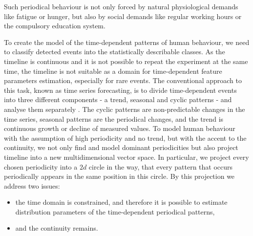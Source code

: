 Such periodical behaviour is not only forced by natural physiological demands like fatigue or hunger, but also by social demands like regular working hours or the compulsory education system. 

To create the model of the time-dependent patterns of human behaviour, we need to classify detected events into the statistically describable classes.
As the timeline is continuous and it is not possible to repeat the experiment at the same time, the timeline is not suitable as a domain for time-dependent feature parameters estimation, especially for rare events.
The conventional approach to this task, known as time series forecasting, is to divide time-dependent events into three different components - a trend, seasonal and cyclic patterns - and analyse them separately \cite{gould2008forecasting}.
The cyclic patterns are non-predictable changes in the time series, seasonal patterns are the periodical changes, and the trend is continuous growth or decline of measured values.
To model human behaviour with the assumption of high periodicity and no trend, but with the accent to the continuity, we not only find and model dominant periodicities but also project timeline into a new multidimensional vector space.
In particular, we project every chosen periodicity into a $2d$ circle in the way, that every pattern that occurs periodically appears in the same position in this circle.
By this projection we address two issues:
\begin{itemize}
    \item the time domain is constrained, and therefore it is possible to estimate distribution parameters of the time-dependent periodical patterns,
    \item and the continuity remains.
\end{itemize}


